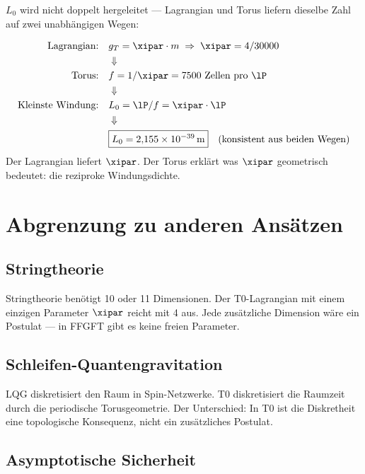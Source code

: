 $L_0$ wird nicht doppelt hergeleitet — Lagrangian und Torus liefern dieselbe Zahl auf zwei unabhängigen Wegen:

\begin{keyresult}
\begin{align}
	\text{Lagrangian:} \quad & g_T = \xipar \cdot m \;\Rightarrow\; \xipar = 4/30000 \notag \\
	& \Downarrow \notag \\
	\text{Torus:} \quad & f = 1/\xipar = 7500 \text{ Zellen pro } \lP \notag \\
	& \Downarrow \notag \\
	\text{Kleinste Windung:} \quad & L_0 = \lP / f = \xipar \cdot \lP \notag \\
	& \Downarrow \notag \\
	& \boxed{L_0 = 2{,}155 \times 10^{-39}\,\text{m}} \quad \text{(konsistent aus beiden Wegen)}
\end{align}
Der Lagrangian liefert $\xipar$. Der Torus erklärt was $\xipar$ geometrisch bedeutet: die reziproke Windungsdichte.
\end{keyresult}

\section{Abgrenzung zu anderen Ansätzen}

\subsection{Stringtheorie}

Stringtheorie benötigt 10 oder 11 Dimensionen. Der T0-Lagrangian mit einem einzigen Parameter $\xipar$ reicht mit 4 aus. Jede zusätzliche Dimension wäre ein Postulat — in FFGFT gibt es keine freien Parameter.

\subsection{Schleifen-Quantengravitation}

LQG diskretisiert den Raum in Spin-Netzwerke. T0 diskretisiert die Raumzeit durch die periodische Torusgeometrie. Der Unterschied: In T0 ist die Diskretheit eine topologische Konsequenz, nicht ein zusätzliches Postulat.

\subsection{Asymptotische Sicherheit}

